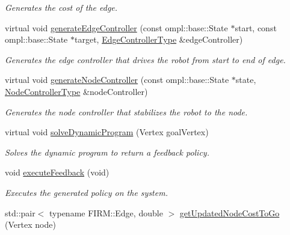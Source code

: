 \begin{DoxyCompactItemize}
\begin{DoxyCompactList}\small\item\em \-Generates the cost of the edge. \end{DoxyCompactList}\item 
\hypertarget{class_f_i_r_m_abfccb43f41872b8da9a4609c1748d21f}{virtual void \hyperlink{class_f_i_r_m_abfccb43f41872b8da9a4609c1748d21f}{generate\-Edge\-Controller} (const ompl\-::base\-::\-State $\ast$start, const ompl\-::base\-::\-State $\ast$target, \hyperlink{class_f_i_r_m_a70abcb24fbc9f836b94119f65c8f8a37}{\-Edge\-Controller\-Type} \&edge\-Controller)}\label{class_f_i_r_m_abfccb43f41872b8da9a4609c1748d21f}

\begin{DoxyCompactList}\small\item\em \-Generates the edge controller that drives the robot from start to end of edge. \end{DoxyCompactList}\item 
\hypertarget{class_f_i_r_m_a1856164aa0dba82e6cfad26a4ef5a7fe}{virtual void \hyperlink{class_f_i_r_m_a1856164aa0dba82e6cfad26a4ef5a7fe}{generate\-Node\-Controller} (const ompl\-::base\-::\-State $\ast$state, \hyperlink{class_controller}{\-Node\-Controller\-Type} \&node\-Controller)}\label{class_f_i_r_m_a1856164aa0dba82e6cfad26a4ef5a7fe}

\begin{DoxyCompactList}\small\item\em \-Generates the node controller that stabilizes the robot to the node. \end{DoxyCompactList}\item 
\hypertarget{class_f_i_r_m_a932c11dc22cdf26b3f24d74adffcf424}{virtual void \hyperlink{class_f_i_r_m_a932c11dc22cdf26b3f24d74adffcf424}{solve\-Dynamic\-Program} (\-Vertex goal\-Vertex)}\label{class_f_i_r_m_a932c11dc22cdf26b3f24d74adffcf424}

\begin{DoxyCompactList}\small\item\em \-Solves the dynamic program to return a feedback policy. \end{DoxyCompactList}\item 
\hypertarget{class_f_i_r_m_ae448791d4c9af9016bc9d5e9de166f0e}{void \hyperlink{class_f_i_r_m_ae448791d4c9af9016bc9d5e9de166f0e}{execute\-Feedback} (void)}\label{class_f_i_r_m_ae448791d4c9af9016bc9d5e9de166f0e}

\begin{DoxyCompactList}\small\item\em \-Executes the generated policy on the system. \end{DoxyCompactList}\item 
\hypertarget{class_f_i_r_m_a44321fba1c038c1f43ccfeccf9a1c44c}{std\-::pair$<$ typename \-F\-I\-R\-M\-::\-Edge, \*
double $>$ \hyperlink{class_f_i_r_m_a44321fba1c038c1f43ccfeccf9a1c44c}{get\-Updated\-Node\-Cost\-To\-Go} (\-Vertex node)}\label{class_f_i_r_m_a44321fba1c038c1f43ccfeccf9a1c44c}


\end{DoxyCompactItemize}
